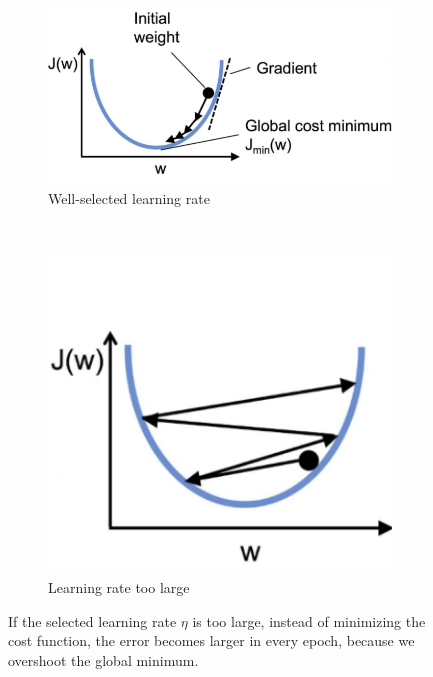 \documentclass[11pt]{article}
\begin{document}
    \begin{figure}[hbt!]
        \centering
        \begin{subfigure}[t]{.58\textwidth}
            \centering
            \includegraphics[width=\columnwidth,trim=1 1 1 1,clip]{img/grad_desc_lr_good.png}
            \caption{Well-selected learning rate}
            \label{fig:grad_desc_lr_good}
        \end{subfigure}
        ~ %
        \begin{subfigure}[t]{.33\textwidth}
            \centering
            \includegraphics[width=\columnwidth,trim=1 1 1 1,clip]{img/grad_desc_lr_large.png}
            \caption{Learning rate too large}
            \label{fig:grad_desc_lr_large}
        \end{subfigure}
        \caption{If the selected learning rate $\eta$ is too large, instead of minimizing the cost function, the error becomes larger in every epoch, because we overshoot the global minimum.}
        \label{fig:grad_desc_learn_rate}
    \end{figure}
\end{document}

